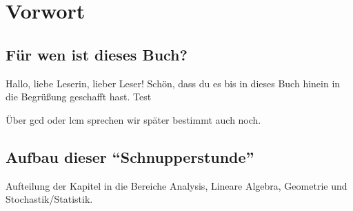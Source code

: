 \chapter{Vorwort}

\section{Für wen ist dieses Buch?}
Hallo, liebe Leserin, lieber Leser! Schön, dass du es bis in dieses Buch hinein in die Begrüßung geschafft hast. Test

Über \acrshort{gcd} oder \acrlong{lcm} sprechen wir später bestimmt auch noch. 

\section{Aufbau dieser "`Schnupperstunde"'}
Aufteilung der Kapitel in die Bereiche Analysis, Lineare Algebra, Geometrie und Stochastik/Statistik. 

